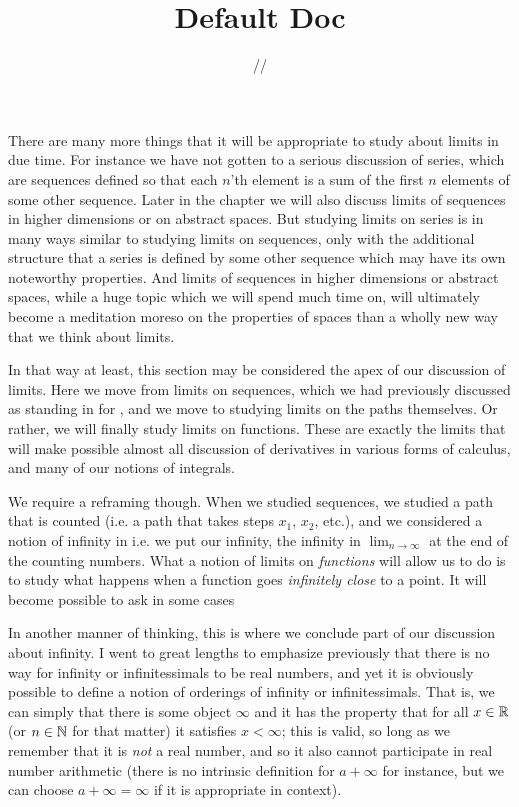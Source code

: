 \documentclass[11pt]{article}
\title{\textbf{Default Doc}}
\date{\the\day/\the\month/\the\year}
\begin{document}
There are many more things that it will be appropriate to study about limits in due time. For instance we have not gotten to a serious discussion of series, which are sequences defined so that each $n$'th element is a sum of the first $n$ elements of some other sequence. Later in the chapter we will also discuss limits of sequences in higher dimensions or on abstract spaces. But studying limits on series is in many ways similar to studying limits on sequences, only with the additional structure that a series is defined by some other sequence which may have its own noteworthy properties. And limits of sequences in higher dimensions or abstract spaces, while a huge topic which we will spend much time on, will ultimately become a meditation moreso on the properties of spaces than a wholly new way that we think about limits.

In that way at least, this section may be considered the apex of our discussion of limits. Here we move from limits on sequences, which we had previously discussed as standing in for , and we move to studying limits on the paths themselves. Or rather, we will finally study limits on functions. These are exactly the limits that will make possible almost all discussion of derivatives in various forms of calculus, and many of our notions of integrals.

We require a reframing though. When we studied sequences, we studied a path that is counted (i.e. a path that takes steps $x_1$, $x_2$, etc.), and we considered a notion of infinity in  i.e. we put our infinity, the infinity in $\lim_{n\to\infty}$ at the end of the counting numbers. What a notion of limits on \emph{functions} will allow us to do is to study what happens when a function goes \emph{infinitely close} to a point. It will become possible to ask in some cases 

In another manner of thinking, this is where we conclude part of our discussion about infinity. I went to great lengths to emphasize previously that there is no way for infinity or infinitessimals to be real numbers, and yet it is obviously possible to define a notion of orderings of infinity or infinitessimals. That is, we can simply  that there is some object $\infty$ and it has the property that for all $x\in \mathbb{R}$ (or $n \in \mathbb{N}$ for that matter) it satisfies $x < \infty$; this is valid, so long as we remember that it is \emph{not} a real number, and so it also cannot participate in real number arithmetic (there is no intrinsic definition for $a + \infty$ for instance, but we can choose $a + \infty = \infty$ if it is appropriate in context).
\end{document}
